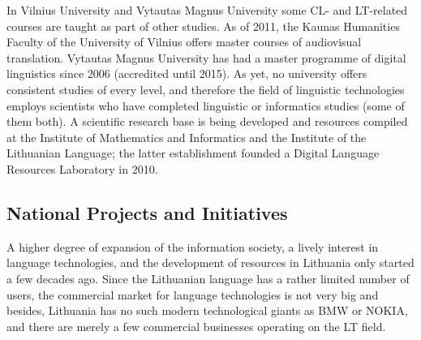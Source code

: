 \documentclass[]{../metanetpaper}
\begin{document}
\begin{multicols}{2}
    In Vilnius University and Vytautas Magnus University some CL- and LT-related courses are taught as part of other studies. As of 2011, the Kaunas Humanities Faculty of the University of Vilnius offers master courses of audiovisual translation. Vytautas Magnus University has had a master programme of digital linguistics  since 2006 (accredited until 2015). As yet, no university offers consistent studies of every level, and therefore the field of linguistic technologies employs scientists who have completed linguistic or informatics studies (some of them both). A scientific research base is being developed and resources compiled at the Institute of Mathematics and Informatics and the Institute of the Lithuanian Language; the latter establishment founded a Digital Language Resources Laboratory in 2010.

\subsection{National Projects and Initiatives}

A higher degree of expansion of the information society, a lively interest in language technologies, and the development of resources in Lithuania only started a few decades ago. Since the Lithuanian language has a rather limited number of users, the commercial market for language technologies is not very big and besides, Lithuania has no such modern technological giants as BMW or NOKIA, and there are merely a few commercial businesses operating on the LT field.  


\end{multicols}
\end{document}
